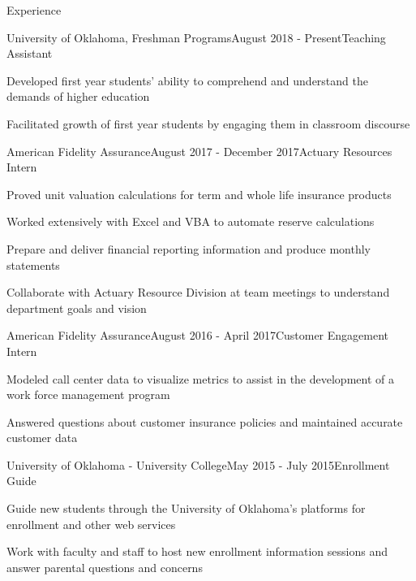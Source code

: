 \documentclass{resume} %
\begin{document}
\begin{rSection}{Experience}

\begin{rSubsection}{University of Oklahoma, Freshman Programs}{August 2018 - Present}{Teaching Assistant}{}
\item Developed first year students’ ability to comprehend and understand the demands of higher education
\item Facilitated growth of first year students by engaging them in classroom discourse
\end{rSubsection}



\begin{rSubsection}{American Fidelity Assurance}{August 2017 - December 2017}{Actuary Resources Intern}{}
\item Proved unit valuation calculations for term and whole life insurance products 
\item Worked extensively with Excel and VBA to automate reserve calculations
\item Prepare and deliver financial reporting information and produce monthly statements 
\item Collaborate with Actuary Resource Division at team meetings to understand department goals and vision
\end{rSubsection}


\begin{rSubsection}{American Fidelity Assurance}{August 2016 - April 2017}{Customer Engagement Intern}{}
\item Modeled call center data to visualize metrics to assist in the development of a work force management program 
\item Answered questions about customer insurance policies and maintained accurate customer data
\end{rSubsection}

\begin{rSubsection}{University of Oklahoma - University College}{May 2015 - July 2015}{Enrollment Guide}{}
\item Guide new students through the University of Oklahoma's platforms for enrollment and other web services
\item Work with faculty and staff to host new enrollment information sessions and answer parental questions and concerns
\end{rSubsection}


\end{rSection}
\end{document}
